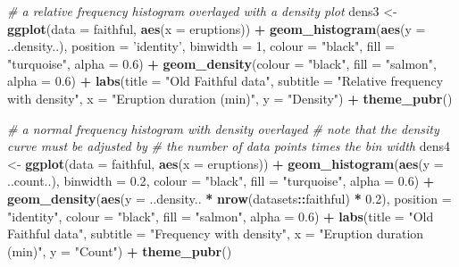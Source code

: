 \documentclass[english,10pt,a4paper,oneside]{book}
\newenvironment{Shaded}{\begin{snugshade}}{\end{snugshade}}
\newcommand{\KeywordTok}[1]{\textcolor[rgb]{0.13,0.29,0.53}{\textbf{#1}}}
\newcommand{\DataTypeTok}[1]{\textcolor[rgb]{0.13,0.29,0.53}{#1}}
\newcommand{\DecValTok}[1]{\textcolor[rgb]{0.00,0.00,0.81}{#1}}
\newcommand{\FloatTok}[1]{\textcolor[rgb]{0.00,0.00,0.81}{#1}}
\newcommand{\StringTok}[1]{\textcolor[rgb]{0.31,0.60,0.02}{#1}}
\newcommand{\CommentTok}[1]{\textcolor[rgb]{0.56,0.35,0.01}{\textit{#1}}}
\newcommand{\OperatorTok}[1]{\textcolor[rgb]{0.81,0.36,0.00}{\textbf{#1}}}
\newcommand{\NormalTok}[1]{#1}
\theoremstyle{definition}
\theoremstyle{definition}
\theoremstyle{definition}
\theoremstyle{remark}
\begin{document}
\begin{Shaded}
\begin{Highlighting}[]
\CommentTok{# a relative frequency histogram overlayed with a density plot}
\NormalTok{dens3 <-}\StringTok{ }\KeywordTok{ggplot}\NormalTok{(}\DataTypeTok{data =}\NormalTok{ faithful, }\KeywordTok{aes}\NormalTok{(}\DataTypeTok{x =}\NormalTok{ eruptions)) }\OperatorTok{+}
\StringTok{  }\KeywordTok{geom_histogram}\NormalTok{(}\KeywordTok{aes}\NormalTok{(}\DataTypeTok{y =}\NormalTok{ ..density..),}
                 \DataTypeTok{position =} \StringTok{'identity'}\NormalTok{, }\DataTypeTok{binwidth =} \DecValTok{1}\NormalTok{,}
                 \DataTypeTok{colour =} \StringTok{"black"}\NormalTok{, }\DataTypeTok{fill =} \StringTok{"turquoise"}\NormalTok{, }\DataTypeTok{alpha =} \FloatTok{0.6}\NormalTok{) }\OperatorTok{+}
\StringTok{  }\KeywordTok{geom_density}\NormalTok{(}\DataTypeTok{colour =} \StringTok{"black"}\NormalTok{, }\DataTypeTok{fill =} \StringTok{"salmon"}\NormalTok{, }\DataTypeTok{alpha =} \FloatTok{0.6}\NormalTok{) }\OperatorTok{+}
\StringTok{  }\KeywordTok{labs}\NormalTok{(}\DataTypeTok{title =} \StringTok{"Old Faithful data"}\NormalTok{,}
       \DataTypeTok{subtitle =} \StringTok{"Relative frequency with density"}\NormalTok{,}
       \DataTypeTok{x =} \StringTok{"Eruption duration (min)"}\NormalTok{,}
       \DataTypeTok{y =} \StringTok{"Density"}\NormalTok{) }\OperatorTok{+}\StringTok{ }\KeywordTok{theme_pubr}\NormalTok{()}

\CommentTok{# a normal frequency histogram with density overlayed}
\CommentTok{# note that the density curve must be adjusted by}
\CommentTok{# the number of data points times the bin width}
\NormalTok{dens4 <-}\StringTok{ }\KeywordTok{ggplot}\NormalTok{(}\DataTypeTok{data =}\NormalTok{ faithful, }\KeywordTok{aes}\NormalTok{(}\DataTypeTok{x =}\NormalTok{ eruptions)) }\OperatorTok{+}
\StringTok{  }\KeywordTok{geom_histogram}\NormalTok{(}\KeywordTok{aes}\NormalTok{(}\DataTypeTok{y =}\NormalTok{ ..count..),}
                 \DataTypeTok{binwidth =} \FloatTok{0.2}\NormalTok{, }\DataTypeTok{colour =} \StringTok{"black"}\NormalTok{, }\DataTypeTok{fill =} \StringTok{"turquoise"}\NormalTok{, }\DataTypeTok{alpha =} \FloatTok{0.6}\NormalTok{) }\OperatorTok{+}
\StringTok{  }\KeywordTok{geom_density}\NormalTok{(}\KeywordTok{aes}\NormalTok{(}\DataTypeTok{y =}\NormalTok{ ..density.. }\OperatorTok{*}\StringTok{ }\KeywordTok{nrow}\NormalTok{(datasets}\OperatorTok{::}\NormalTok{faithful) }\OperatorTok{*}\StringTok{ }\FloatTok{0.2}\NormalTok{), }\DataTypeTok{position =} \StringTok{"identity"}\NormalTok{,}
               \DataTypeTok{colour =} \StringTok{"black"}\NormalTok{, }\DataTypeTok{fill =} \StringTok{"salmon"}\NormalTok{, }\DataTypeTok{alpha =} \FloatTok{0.6}\NormalTok{) }\OperatorTok{+}
\StringTok{  }\KeywordTok{labs}\NormalTok{(}\DataTypeTok{title =} \StringTok{"Old Faithful data"}\NormalTok{,}
       \DataTypeTok{subtitle =} \StringTok{"Frequency with density"}\NormalTok{,}
       \DataTypeTok{x =} \StringTok{"Eruption duration (min)"}\NormalTok{,}
       \DataTypeTok{y =} \StringTok{"Count"}\NormalTok{) }\OperatorTok{+}\StringTok{ }\KeywordTok{theme_pubr}\NormalTok{()}


\end{Highlighting}
\end{Shaded}
\end{document}
